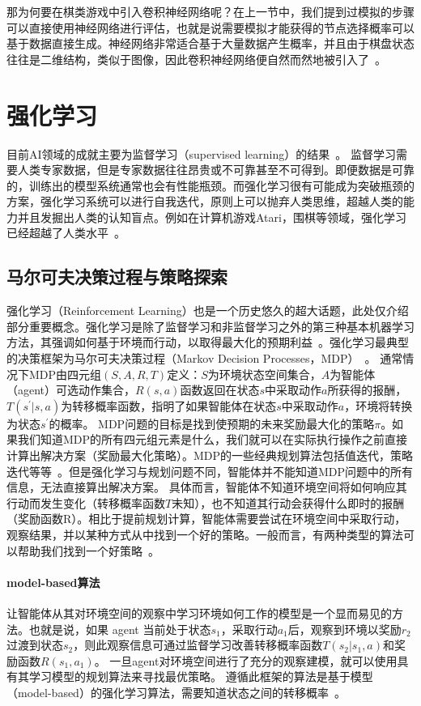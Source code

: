 那为何要在棋类游戏中引入卷积神经网络呢？在上一节中，我们提到过模拟的步骤可以直接使用神经网络进行评估，也就是说需要模拟才能获得的节点选择概率可以基于数据直接生成。神经网络非常适合基于大量数据产生概率，并且由于棋盘状态往往是二维结构，类似于图像，因此卷积神经网络便自然而然地被引入了~\cite{Silver1140,Silver2017,Silver2016}。

\section{强化学习}
目前AI领域的成就主要为监督学习（supervised learning）的结果~\cite{hastie2009elements,NIPS2012_4824,lecun2015deep,resnet}。
监督学习需要人类专家数据，但是专家数据往往昂贵或不可靠甚至不可得到。即便数据是可靠的，训练出的模型系统通常也会有性能瓶颈。而强化学习很有可能成为突破瓶颈的方案，强化学习系统可以进行自我迭代，原则上可以抛弃人类思维，超越人类的能力并且发掘出人类的认知盲点。例如在计算机游戏Atari，围棋等领域，强化学习已经超越了人类水平~\cite{Silver2016}。
\subsection{马尔可夫决策过程与策略探索}
强化学习（Reinforcement Learning）也是一个历史悠久的超大话题，此处仅介绍部分重要概念。强化学习是除了监督学习和非监督学习之外的第三种基本机器学习方法，其强调如何基于环境而行动，以取得最大化的预期利益~\cite{Sutton1998}。强化学习最典型的决策框架为马尔可夫决策过程（Markov Decision Processes，MDP）~\cite{Bel}。
通常情况下MDP由四元组$(S,A,R,T)$定义：$S$为环境状态空间集合，$A$为智能体（agent）可选动作集合，$R(s,a)$函数返回在状态$s$中采取动作$a$所获得的报酬，$T(s^{\prime}|s,a)$为转移概率函数，指明了如果智能体在状态$s$中采取动作$a$，环境将转换为状态$s^{\prime}$的概率。
MDP问题的目标是找到使预期的未来奖励最大化的策略$\pi$。如果我们知道MDP的所有四元组元素是什么，我们就可以在实际执行操作之前直接计算出解决方案（奖励最大化策略）。MDP的一些经典规划算法包括值迭代，策略迭代等等~\cite{Sutton1998}。但是强化学习与规划问题不同，智能体并不能知道MDP问题中的所有信息，无法直接算出解决方案。
具体而言，智能体不知道环境空间将如何响应其行动而发生变化（转移概率函数$T$未知），也不知道其行动会获得什么即时的报酬（奖励函数R）。相比于提前规划计算，智能体需要尝试在环境空间中采取行动，观察结果，并以某种方式从中找到一个好的策略。一般而言，有两种类型的算法可以帮助我们找到一个好策略~\cite{rlbase}。

\paragraph{model-based算法}
让智能体从其对环境空间的观察中学习环境如何工作的模型是一个显而易见的方法。也就是说，如果 agent 当前处于状态$s_{1}$，采取行动$a_{1}$后，观察到环境以奖励$r_{2}$过渡到状态$s_{2}$，则此观察信息可通过监督学习改善转移概率函数$T(s_{2}|s_{1},a)$和奖励函数$R(s_{1},a_{1})$。
一旦agent对环境空间进行了充分的观察建模，就可以使用具有其学习模型的规划算法来寻找最优策略。 遵循此框架的算法是基于模型（model-based）的强化学习算法，需要知道状态之间的转移概率~\cite{moerland2021modelbased,606886,10.1162/089976602753712972}。
